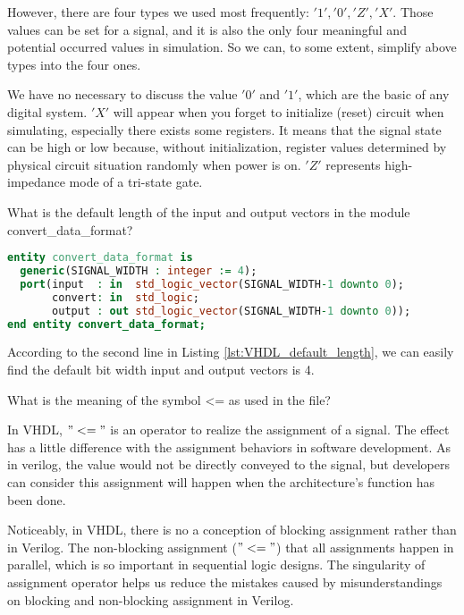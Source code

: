 \documentclass[12pt]{article}
\begin{document}
However, there are four types we used most frequently: \('1','0','Z','X'\).
Those values can be set for a signal, and it is also the only four meaningful and potential occurred values in simulation.
So we can, to some extent, simplify above types into the four ones.

We have no necessary to discuss the value \('0'\) and \('1'\), which are the basic of any digital system.
\('X'\) will appear when you forget to initialize (reset) circuit when simulating, especially there exists some registers.
It means that the signal state can be high or low because, without initialization, register values determined by physical circuit situation randomly when power is on.
\('Z'\) represents high-impedance mode of a tri-state gate.

\begin{questionbox}
What is the default length of the input and output vectors in the module convert\_data\_format?
\end{questionbox}


\begin{lstlisting}[caption={Entity declaration in "convert\_data\_format.vhdl"}, label={lst:VHDL_default_length}, language=VHDL]
entity convert_data_format is
  generic(SIGNAL_WIDTH : integer := 4);
  port(input  : in  std_logic_vector(SIGNAL_WIDTH-1 downto 0);
       convert: in  std_logic;
       output : out std_logic_vector(SIGNAL_WIDTH-1 downto 0));
end entity convert_data_format;
\end{lstlisting}

According to the second line in Listing \ref{lst:VHDL_default_length}, we can easily find the default bit width input and output vectors is 4.

\begin{questionbox}
What is the meaning of the symbol <= as used in the file?
\end{questionbox}

In VHDL, \("<="\) is an operator to realize the assignment of a signal.
The effect has a little difference with the assignment behaviors in software development.
As in verilog, the value would not be directly conveyed to the signal, but developers can consider this assignment will happen when the architecture's function has been done.

\begin{notebox}
    Noticeably, in VHDL, there is no a conception of blocking assignment rather than in Verilog.
    The non-blocking assignment (\("<="\)) that all assignments happen in parallel, which is so important in sequential logic designs.
    The singularity of assignment operator helps us reduce the mistakes caused by misunderstandings on blocking and non-blocking assignment in Verilog.
\end{notebox}
\end{document}
